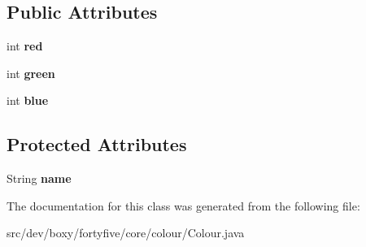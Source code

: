 \subsection*{Public Attributes}
\begin{DoxyCompactItemize}
\item 
\hypertarget{classdev_1_1boxy_1_1fortyfive_1_1core_1_1colour_1_1_colour_a2923614dc91fb1e6a6ef4fe88540faf4}{
int {\bfseries red}}
\label{d1/de3/classdev_1_1boxy_1_1fortyfive_1_1core_1_1colour_1_1_colour_a2923614dc91fb1e6a6ef4fe88540faf4}

\item 
\hypertarget{classdev_1_1boxy_1_1fortyfive_1_1core_1_1colour_1_1_colour_a1db21cb2958a47a551470852251ed5ca}{
int {\bfseries green}}
\label{d1/de3/classdev_1_1boxy_1_1fortyfive_1_1core_1_1colour_1_1_colour_a1db21cb2958a47a551470852251ed5ca}

\item 
\hypertarget{classdev_1_1boxy_1_1fortyfive_1_1core_1_1colour_1_1_colour_a7cebbd4c37aada13324dcdd643654ba3}{
int {\bfseries blue}}
\label{d1/de3/classdev_1_1boxy_1_1fortyfive_1_1core_1_1colour_1_1_colour_a7cebbd4c37aada13324dcdd643654ba3}

\end{DoxyCompactItemize}
\subsection*{Protected Attributes}
\begin{DoxyCompactItemize}
\item 
\hypertarget{classdev_1_1boxy_1_1fortyfive_1_1core_1_1colour_1_1_colour_a4802ae64ec89430da41a4634443ab655}{
String {\bfseries name}}
\label{d1/de3/classdev_1_1boxy_1_1fortyfive_1_1core_1_1colour_1_1_colour_a4802ae64ec89430da41a4634443ab655}

\end{DoxyCompactItemize}


The documentation for this class was generated from the following file:\begin{DoxyCompactItemize}
\item 
src/dev/boxy/fortyfive/core/colour/Colour.java\end{DoxyCompactItemize}
